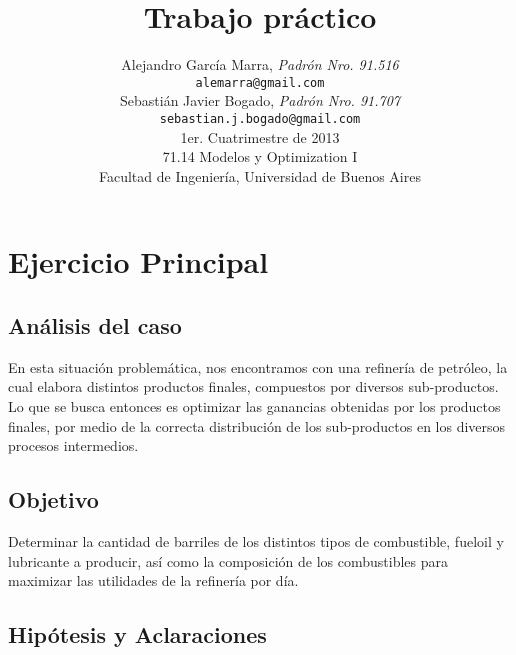 \documentclass[a4paper,10pt]{article}
\title{		\textbf{Trabajo pr\'actico}}
\author{	Alejandro Garc\'ia Marra, \textit{Padr\'on Nro. 91.516}                     \\
            \texttt{ alemarra@gmail.com }                                              \\
            Sebasti\'an Javier Bogado, \textit{Padr\'on Nro. 91.707}                     \\
            \texttt{ sebastian.j.bogado@gmail.com }                                              \\
            \normalsize{1er. Cuatrimestre de 2013}                       \\
            \normalsize{71.14 Modelos y Optimization I}                             \\
            \normalsize{Facultad de Ingenier\'ia, Universidad de Buenos Aires}            \\
       }
\date{}
\begin{document}
\maketitle

\thispagestyle{empty}


\newpage
\section{Ejercicio Principal}

\subsection{An\'alisis del caso}

En esta situaci\'on problem\'atica, nos encontramos con una refiner\'ia de petr\'oleo, la cual elabora distintos productos finales, compuestos por diversos sub-productos. Lo que se busca entonces es optimizar las ganancias obtenidas por los productos finales, por medio de la correcta distribuci\'on de los sub-productos en los diversos procesos intermedios.

\subsection{Objetivo}
Determinar la cantidad de barriles de los distintos tipos de combustible, fueloil y lubricante a producir, as\'i como la composici\'on de los combustibles para maximizar las utilidades de la refiner\'ia por d\'ia.
\vspace{10mm}

\subsection{Hip\'otesis y Aclaraciones}
\end{document}
